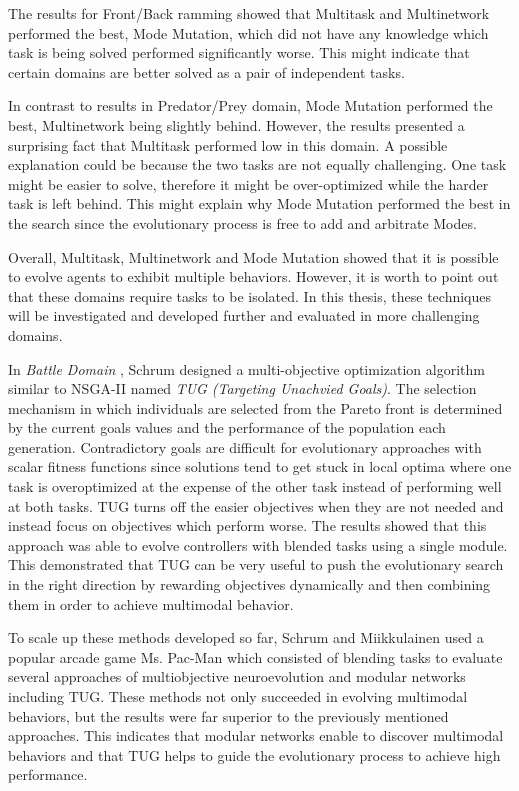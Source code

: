\documentclass[format=acmsmall, review=false, screen=true]{acmart}
\begin{document}
The results for Front/Back ramming showed that Multitask and Multinetwork performed the best, Mode Mutation, which did not have any knowledge which task is being solved performed significantly worse. This might indicate that certain domains are better solved as a pair of independent tasks.

In contrast to results in Predator/Prey domain, Mode Mutation performed the best, Multinetwork being slightly behind. However, the results presented a surprising fact that Multitask performed low in this domain. A possible explanation could be because the two tasks are not equally challenging. One task might be easier to solve, therefore it might be over-optimized while the harder task is left behind. This might explain why Mode Mutation performed the best in the search since the evolutionary process is free to add and arbitrate Modes.

Overall, Multitask, Multinetwork and Mode Mutation showed that it is possible to evolve agents to exhibit multiple behaviors. However, it is worth to point out that these domains require tasks to be isolated. In this thesis, these techniques will be investigated and developed further and evaluated in more challenging domains.

In \emph{Battle Domain} \cite{schrum2010evolving}, Schrum designed a multi-objective optimization algorithm similar to NSGA-II named \emph{TUG (Targeting Unachvied Goals)}. The selection mechanism in which individuals are selected from the Pareto front is determined by the current goals values and the performance of the population each generation. Contradictory goals are difficult for evolutionary approaches with scalar fitness functions since solutions tend to get stuck in local optima where one task is overoptimized at the expense of the other task instead of performing well at both tasks. TUG turns off the easier objectives when they are not needed and instead focus on objectives which perform worse. The results showed that this approach was able to evolve controllers with blended tasks using a single module. This demonstrated that TUG can be very useful to push the evolutionary search in the right direction by rewarding objectives dynamically and then combining them in order to achieve multimodal behavior.

To scale up these methods developed so far, Schrum and Miikkulainen \cite{schrummiikk2014evolving} used a popular arcade game Ms. Pac-Man which consisted of blending tasks to evaluate several approaches of multiobjective neuroevolution and modular networks including TUG. These methods not only succeeded in evolving multimodal behaviors, but the results were far superior to the previously mentioned approaches. This indicates that modular networks enable to discover multimodal behaviors and that TUG helps to guide the evolutionary process to achieve high performance.
\end{document}
